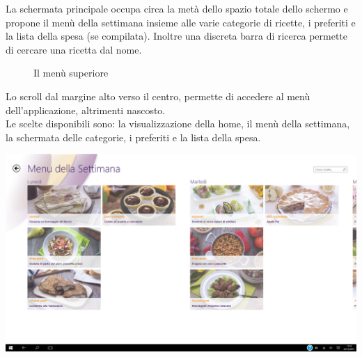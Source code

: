 La schermata principale occupa circa la metà dello spazio totale dello schermo e propone il menù della settimana insieme alle varie categorie di ricette, i preferiti e la lista della spesa (se compilata). Inoltre una discreta barra di ricerca permette di cercare una ricetta dal nome.

\begin{figure}[h]
  \caption{Il menù superiore}
  \label{fig:key}
\end{figure}

Lo scroll dal margine alto verso il centro, permette di accedere al menù dell'applicazione, altrimenti nascosto.\\
Le scelte disponibili sono: la visualizzazione della home, il menù della settimana, la schermata delle categorie, i preferiti e la lista della spesa.\\

\begin{center}
\includegraphics[scale=0.25] {img/Giallozafferano/menu_settimana.png}  
\end{center}

